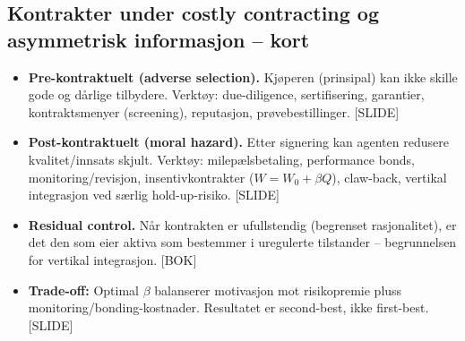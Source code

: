 \subsection*{Kontrakter under costly contracting og asymmetrisk informasjon -- kort}
\begin{itemize}\setlength{\itemsep}{2pt}
\item \textbf{Pre-kontraktuelt (adverse selection).} Kjøperen (prinsipal) kan ikke skille gode og dårlige tilbydere. Verktøy: due-diligence, sertifisering, garantier, kontraktsmenyer (screening), reputasjon, prøvebestillinger. [SLIDE]
\item \textbf{Post-kontraktuelt (moral hazard).} Etter signering kan agenten redusere kvalitet/innsats skjult. Verktøy: milepælsbetaling, performance bonds, monitoring/revisjon, insentivkontrakter ($W = W_0 + \beta Q$), claw-back, vertikal integrasjon ved særlig hold-up-risiko. [SLIDE]
\item \textbf{Residual control.} Når kontrakten er ufullstendig (begrenset rasjonalitet), er det den som eier aktiva som bestemmer i uregulerte tilstander -- begrunnelsen for vertikal integrasjon. [BOK]
\item \textbf{Trade-off:} Optimal $\beta$ balanserer motivasjon mot risikopremie pluss monitoring/bonding-kostnader. Resultatet er second-best, ikke first-best. [SLIDE]
\end{itemize}


